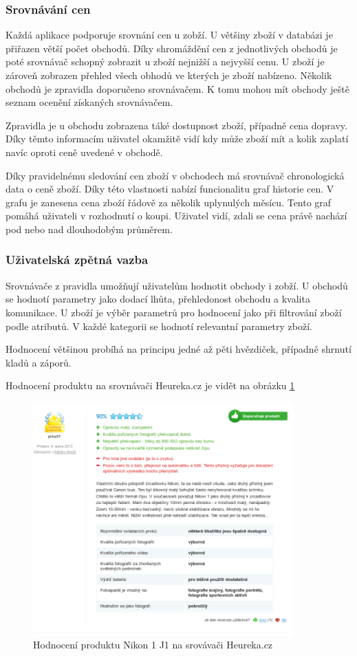 \subsubsection{Srovnávání cen}
Každá aplikace podporuje srovnání cen u zobží. U většiny zboží v databázi je přiřazen větší počet obchodů. Díky shromáždění cen z jednotlivých obchodů je poté srovnávač schopný zobrazit u zboží nejnižší a nejvyšší cenu. U zboží je zároveň zobrazen přehled všech obhodů ve kterých je zboží nabízeno. Několik obchodů je zpravidla doporučeno srovnávačem. K tomu mohou mít obchody ještě seznam ocenění získaných srovnávačem.

Zpravidla je u obchodu zobrazena táké dostupnost zboží, případně cena dopravy. Díky těmto informacím uživatel okamžitě vidí kdy může zboží mít a kolik zaplatí navíc oproti ceně uvedené v obchodě.

Díky pravidelnému sledování cen zboží v obchodech má srovnávač chronologická data o ceně zboží. Díky této vlastnosti nabízí funcionalitu graf historie cen. V grafu je zanesena cena zboží řádově za několik uplynulých měsícu. Tento graf pomáhá uživateli v rozhodnutí o koupi. Uživatel vidí, zdali se cena právě nachází pod nebo nad dlouhodobým průměrem.

\subsubsection{Uživatelská zpětná vazba}
Srovnávače z pravidla umožňují uživatelům hodnotit obchody i zobží. U obchodů se hodnotí parametry jako dodací lhůta, přehledonost obchodu a kvalita komunikace. U zboží je výběr parametrů pro hodnocení jako při filtrování zboží podle atributů. V každé kategorii se hodnotí relevantní parametry zboží. 

Hodnocení většinou probíhá na principu jedné až pěti hvězdiček, případně shrnutí kladů a záporů.

Hodnocení produktu na srovnávači Heureka.cz je vidět na obrázku \ref{fig:heureka-hodnoceni-produktu}

\begin{figure}[htb]
\begin{center}
\includegraphics[width=100mm]{./pictures/heureka-hodnoceni-produktu.png}
\caption{Hodnocení produktu Nikon 1 J1 na srovávači Heureka.cz}
\label{fig:heureka-hodnoceni-produktu}
\end{center}
\end{figure}

